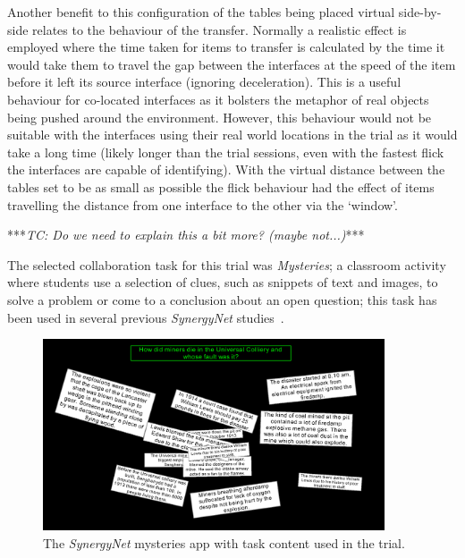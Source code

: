 \documentclass[twocolumn]{svjour3}          %
\begin{document}
Another benefit to this configuration of the tables being placed virtual side-by-side relates to the behaviour of the transfer.
Normally a realistic effect is employed where the time taken for items to transfer is calculated by the time it would take them to travel the gap between the interfaces at the speed of the item before it left its source interface (ignoring deceleration).
This is a useful behaviour for co-located interfaces as it bolsters the metaphor of real objects being pushed around the environment.
However, this behaviour would not be suitable with the interfaces using their real world locations in the trial as it would take a long time (likely longer than the trial sessions, even with the fastest flick the interfaces are capable of identifying).
With the virtual distance between the tables set to be as small as possible the flick behaviour had the effect of items travelling the distance from one interface to the other via the `window'.


***{\emph{TC: Do we need to explain this a bit more? (maybe not...)}}***

The selected collaboration task for this trial was {\emph{Mysteries}}; a classroom activity where students use a selection of clues, such as snippets of text and images, to solve a problem or come to a conclusion about an open question; this task has been used in several previous {\emph{SynergyNet}} studies~\citep{mercier:2013,mercier:2014,mercier:2015}.

\begin{figure}[h]
 \centering
   \includegraphics[width=0.9\textwidth]{figures/flickmysteryexample.png}
   \caption{The {\emph{SynergyNet}} mysteries app with task content used in the trial.}
   \label{fig:FlickMysteryExample}
\end{figure}
\end{document}
